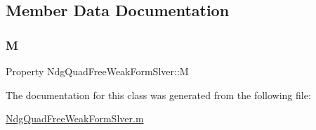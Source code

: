 \subsection{Member Data Documentation}
\mbox{\label{class_ndg_quad_free_weak_form_slver_adb8fdadbf242325043863007957e0b3c}} 
\subsubsection{\texorpdfstring{M}{M}}
{\footnotesize\ttfamily Property Ndg\+Quad\+Free\+Weak\+Form\+Slver\+::M}



The documentation for this class was generated from the following file\+:\begin{DoxyCompactItemize}
\item 
\hyperlink{_ndg_quad_free_weak_form_slver_8m}{Ndg\+Quad\+Free\+Weak\+Form\+Slver.\+m}\end{DoxyCompactItemize}
